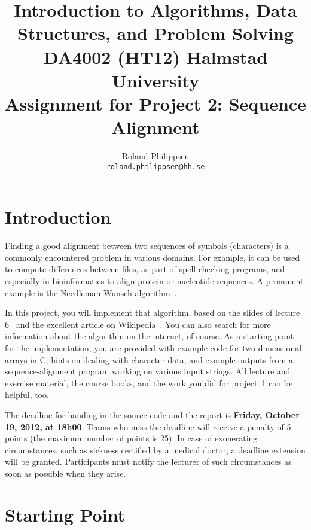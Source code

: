 \documentclass[a4paper,10pt]{article}
\begin{document}
\title{
  {\normalsize
    Introduction to Algorithms, Data Structures, and Problem Solving\\
    DA4002 (HT12) Halmstad University}\\
  Assignment for Project 2: Sequence Alignment\\
}
\author{
  Roland Philippsen\\
  \texttt{roland.philippsen@hh.se}
}
\maketitle



\section{Introduction}

Finding a good alignment between two sequences of symbols (characters) is a commonly encountered problem in various domains.
For example, it can be used to compute differences between files, as part of spell-checking programs, and especially in bioinformatics to align protein or nucleotide sequences.
A prominent example is the Needleman-Wunsch algorithm~\cite{needleman-wunsch:1970}.

In this project, you will implement that algorithm, based on the slides of lecture 6~\cite{lecture6} and the excellent article on Wikipedia~\cite{wikipedia:needleman-wunsch}.
You can also search for more information about the algorithm on the internet, of course.
As a starting point for the implementation, you are provided with example code for two-dimensional arrays in C, hints on dealing with character data, and example outputs from a sequence-alignment program working on various input strings.
All lecture and exercise material, the course books, and the work you did for project~1 can be helpful, too.

The deadline for handing in the source code and the report is \textbf{Friday, October 19, 2012, at 18h00}.
Teams who miss the deadline will receive a penalty of 5 points (the maximum number of points is 25).
In case of exonerating circumstances, such as sickness certified by a medical doctor, a deadline extension will be granted.
Participants must notify the lecturer of such circumstances as soon as possible when they arise.



\section{Starting Point}
\end{document}
